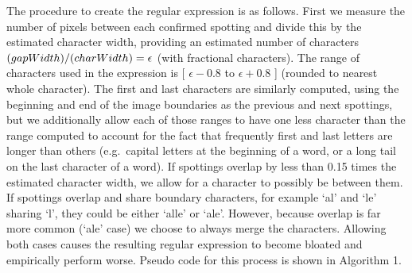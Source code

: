 \documentclass[ms,electronic,twosidetoc,letterpaper,chaptercenter,parttop,lof,lot]{byumsphd}
\begin{document}
The procedure to create the regular expression is as follows. First we measure the number of pixels between each confirmed spotting and divide this by the estimated character width, providing an estimated number of characters $\text(gapWidth)/\text(charWidth) = \epsilon$ (with fractional characters). The range of characters used in the expression is 
[ $\epsilon-0.8$ to $\epsilon+0.8$ ] (rounded to nearest whole character).
 The first and last characters are similarly computed, using the beginning and end of the image boundaries as the previous and next spottings, but we additionally allow each of those ranges to have one less character than the range computed to account for the fact that frequently first and last letters are longer than others (e.g.~capital letters at the beginning of a word, or a long tail on the last character of a word). If spottings overlap by less than 0.15 times the estimated character width, we allow for a character to possibly be between them.
If spottings overlap and share boundary characters, for example `al' and `le' sharing `l', they could be either `alle' or `ale'. However, because overlap is far more common (`ale' case) we choose to always merge the characters.  Allowing both cases causes the resulting regular expression to become bloated and empirically perform worse.
Pseudo code for this process is shown in Algorithm 1.%
\end{document}
